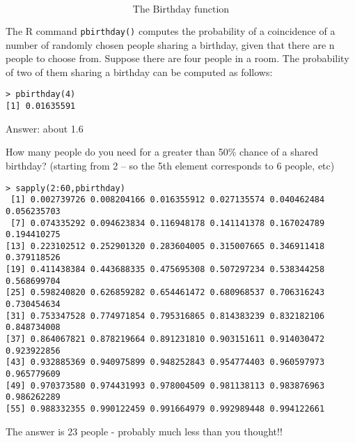 \begin{frame}[fragile]
\huge
\[\mbox{
The Birthday function}\]
\end{frame}
\begin{frame}[fragile]
The R command \texttt{pbirthday()} computes the probability of a coincidence of a number of randomly chosen people sharing a birthday, given that there are n people to choose from.
Suppose there are four people in a room. The probability of two of them sharing a birthday can be computed as follows:
\begin{framed}
\begin{verbatim}
> pbirthday(4)
[1] 0.01635591
\end{verbatim}
\end{framed}
Answer:  about 1.6 %

\end{frame}
\begin{frame}[fragile]

How many people do you need for a greater than 50\% chance of a shared birthday?
(starting from 2 – so the 5th element corresponds to 6 people, etc)

\end{frame}
\begin{frame}[fragile]
\begin{framed}
\begin{verbatim}
> sapply(2:60,pbirthday)
 [1] 0.002739726 0.008204166 0.016355912 0.027135574 0.040462484 0.056235703
 [7] 0.074335292 0.094623834 0.116948178 0.141141378 0.167024789 0.194410275
[13] 0.223102512 0.252901320 0.283604005 0.315007665 0.346911418 0.379118526
[19] 0.411438384 0.443688335 0.475695308 0.507297234 0.538344258 0.568699704
[25] 0.598240820 0.626859282 0.654461472 0.680968537 0.706316243 0.730454634
[31] 0.753347528 0.774971854 0.795316865 0.814383239 0.832182106 0.848734008
[37] 0.864067821 0.878219664 0.891231810 0.903151611 0.914030472 0.923922856
[43] 0.932885369 0.940975899 0.948252843 0.954774403 0.960597973 0.965779609
[49] 0.970373580 0.974431993 0.978004509 0.981138113 0.983876963 0.986262289
[55] 0.988332355 0.990122459 0.991664979 0.992989448 0.994122661
\end{verbatim}
\end{framed}

The answer is 23 people - probably much less than you thought!!
\end{frame}

